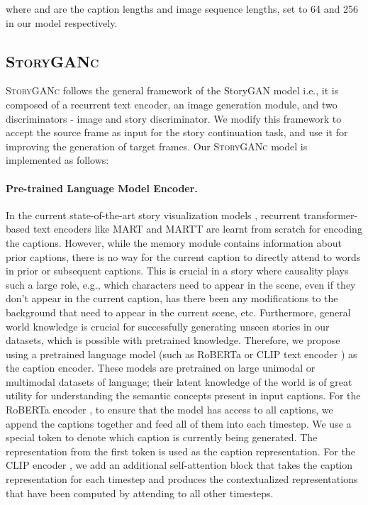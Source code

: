 \documentclass[runningheads]{llncs}
\newcommand{\sgan}[1]{\textsc{StoryGANc}}
\begin{document}
where  and  are the caption lengths and image sequence lengths, set to 64 and 256 in our model respectively.


\subsection{\sgan{}}
\sgan{} follows the general framework of the StoryGAN model \cite{li2019storygan} i.e., it is composed of a recurrent text encoder, an image generation module, and two discriminators - image and story discriminator. We modify this framework to accept the source frame as input for the story continuation task, and use it for improving the generation of target frames. Our \sgan{} model is implemented as follows:

\paragraph{Pre-trained Language Model Encoder.}
In the current state-of-the-art story visualization models \cite{maharana2021improving}, recurrent transformer-based text encoders like MART \cite{lei2020mart} and MARTT \cite{maharana2021integrating} are learnt from scratch for encoding the captions. However, while the memory module contains information about prior captions, there is no way for the current caption to directly attend to words in prior or subsequent captions. This is crucial in a story where causality plays such a large role, e.g., which characters need to appear in the scene, even if they don't appear in the current caption, has there been any modifications to the background that need to appear in the current scene, etc. Furthermore, general world knowledge is crucial for successfully generating unseen stories in our datasets, which is possible with pretrained knowledge. Therefore, we propose using a pretrained language model (such as RoBERTa \cite{liu2019roberta} or CLIP text encoder \cite{radford2021learning}) as the caption encoder. These models are pretrained on large unimodal or multimodal datasets of language; their latent knowledge of the world is of great utility for understanding the semantic concepts present in input captions. For the RoBERTa encoder \cite{liu2019roberta}, to ensure that the model has access to all captions, we append the captions together and feed all of them into each timestep. We use a special token to denote which caption is currently being generated. The representation from the first token  is used as the caption representation. For the CLIP encoder \cite{radford2021learning}, we add an additional self-attention block that takes the caption representation for each timestep and produces the contextualized representations that have been computed by attending to all other timesteps.
\end{document}

